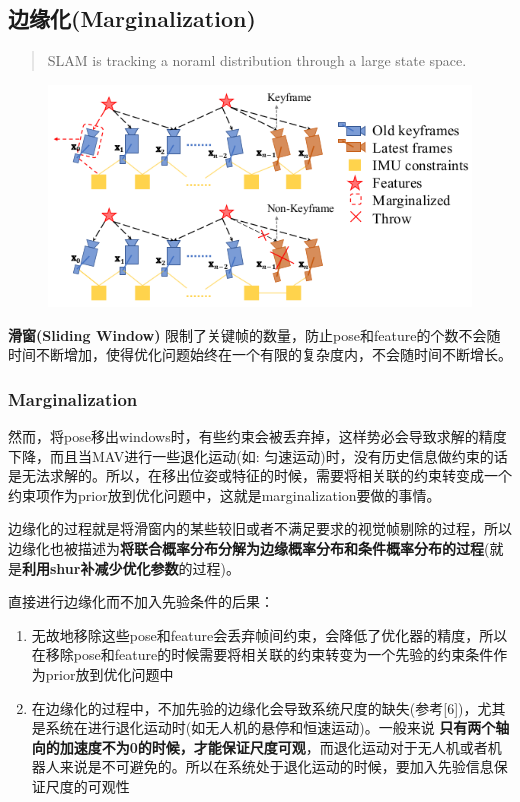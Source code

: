 \documentclass[12pt,a4paper]{article}
\begin{document}
\subsection{边缘化(Marginalization)}

\begin{quote}
SLAM is tracking a noraml distribution through a large state space.
\end{quote}

\begin{figure}[htbp]
\centering
\includegraphics[scale=0.6]{images/marginalization.png}
\end{figure}

\textbf{滑窗(Sliding Window)} 限制了关键帧的数量，防止pose和feature的个数不会随时间不断增加，使得优化问题始终在一个有限的复杂度内，不会随时间不断增长。

\subsubsection{Marginalization}

然而，将pose移出windows时，有些约束会被丢弃掉，这样势必会导致求解的精度下降，而且当MAV进行一些退化运动(如: 匀速运动)时，没有历史信息做约束的话是无法求解的。所以，在移出位姿或特征的时候，需要将相关联的约束转变成一个约束项作为prior放到优化问题中，这就是marginalization要做的事情。

边缘化的过程就是将滑窗内的某些较旧或者不满足要求的视觉帧剔除的过程，所以边缘化也被描述为\textbf{将联合概率分布分解为边缘概率分布和条件概率分布的过程}(就是\textbf{利用shur补减少优化参数}的过程)。

直接进行边缘化而不加入先验条件的后果：

\begin{enumerate}
\item 无故地移除这些pose和feature会丢弃帧间约束，会降低了优化器的精度，所以在移除pose和feature的时候需要将相关联的约束转变为一个先验的约束条件作为prior放到优化问题中

\item 在边缘化的过程中，不加先验的边缘化会导致系统尺度的缺失(参考[6])，尤其是系统在进行退化运动时(如无人机的悬停和恒速运动)。一般来说 \textbf{只有两个轴向的加速度不为0的时候，才能保证尺度可观}，而退化运动对于无人机或者机器人来说是不可避免的。所以在系统处于退化运动的时候，要加入先验信息保证尺度的可观性
\end{enumerate}
\end{document}
